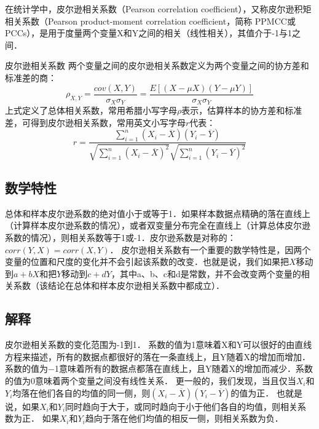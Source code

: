 
在统计学中，皮尔逊相关系数（Pearson correlation coefficient），又称皮尔逊积矩相关系数（Pearson product-moment correlation coefficient，简称 PPMCC或PCCs），是用于度量两个变量X和Y之间的相关（线性相关），其值介于-1与1之间．
\begin{definition}{皮尔逊相关系数}\label{PearsR_def1}
两个变量之间的皮尔逊相关系数定义为两个变量之间的协方差和标准差的商：
\begin{equation}
\rho_{X,Y}=\frac{cov(X,Y)}{\sigma_{X}\sigma_{Y}}=\frac{E[(X-\mu X)(Y-\mu Y)]}{\sigma_{X}\sigma_{Y}}
\end{equation}
上式定义了总体相关系数，常用希腊小写字母$\rho$表示，估算样本的协方差和标准差，可得到皮尔逊相关系数，常用英文小写字母$r$代表：
\begin{equation}
r=\frac{\sum_{i=1}^n\left(X_i-\overline X\right)\left(Y_i-\overline Y\right)}{\sqrt{\sum_{i=1}^n\left(X_i-\overline X\right)^2}\sqrt{\sum_{i=1}^n\left(Y_i-\overline Y\right)^2}}
\end{equation}
\end{definition}
\subsection{数学特性}
总体和样本皮尔逊系数的绝对值小于或等于1．如果样本数据点精确的落在直线上（计算样本皮尔逊系数的情况），或者双变量分布完全在直线上（计算总体皮尔逊系数的情况），则相关系数等于1或-1．皮尔逊系数是对称的： $corr(Y,X)=corr(X,Y)$．
皮尔逊相关系数有一个重要的数学特性是，因两个变量的位置和尺度的变化并不会引起该系数的改变．也就是说，我们如果把$X$移动到$a+bX$和把$Y$移动到$c+dY$，其中a、b、c和d是常数，并不会改变两个变量的相关系数（该结论在总体和样本皮尔逊相关系数中都成立）．
\subsection{解释}
皮尔逊相关系数的变化范围为-1到1． 系数的值为1意味着X和Y可以很好的由直线方程来描述，所有的数据点都很好的落在一条直线上，且Y随着X的增加而增加．系数的值为−1意味着所有的数据点都落在直线上，且Y随着X的增加而减少．系数的值为0意味着两个变量之间没有线性关系．
更一般的，我们发现，当且仅当$X_i$和$Y_i$均落在他们各自的均值的同一侧，则$(X_i-\overline X)(Y_i-\overline Y)$的值为正． 也就是说，如果$X_i$和$Y_i$同时趋向于大于，或同时趋向于小于他们各自的均值，则相关系数为正． 如果$X_i$和$Y_i$趋向于落在他们均值的相反一侧，则相关系数为负．